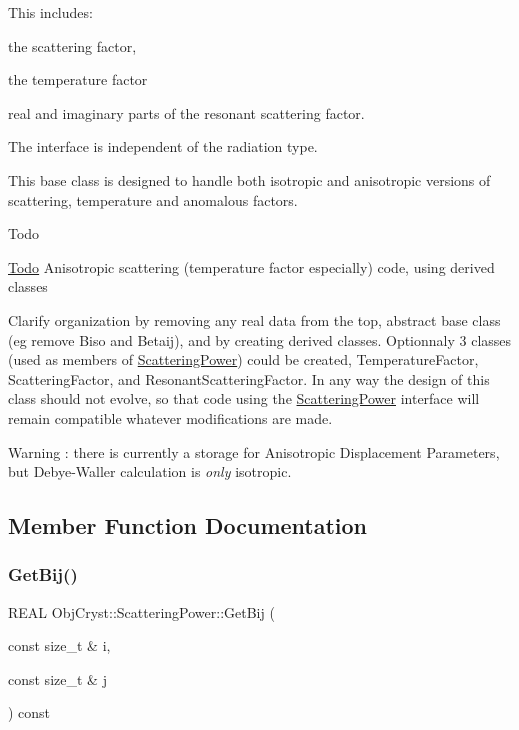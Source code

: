 This includes\+:
\begin{DoxyItemize}
\item the scattering factor,
\item the temperature factor
\item real and imaginary parts of the resonant scattering factor.
\end{DoxyItemize}

The interface is independent of the radiation type.

This base class is designed to handle both isotropic and anisotropic versions of scattering, temperature and anomalous factors.

\begin{DoxyRefDesc}{Todo}
\item[\mbox{\hyperlink{todo__todo000012}{Todo}}]Anisotropic scattering (temperature factor especially) code, using derived classes 

Clarify organization by removing any \textquotesingle{}real\textquotesingle{} data from the top, abstract base class (eg remove Biso and Betaij), and by creating derived classes. Optionnaly 3 classes (used as members of \mbox{\hyperlink{class_obj_cryst_1_1_scattering_power}{Scattering\+Power}}) could be created, Temperature\+Factor, Scattering\+Factor, and Resonant\+Scattering\+Factor. In any way the design of this class should not evolve, so that code using the \mbox{\hyperlink{class_obj_cryst_1_1_scattering_power}{Scattering\+Power}} interface will remain compatible whatever modifications are made. \end{DoxyRefDesc}
\begin{DoxyWarning}{Warning}
\+: there is currently a storage for Anisotropic Displacement Parameters, but Debye-\/\+Waller calculation is {\itshape only} isotropic. 
\end{DoxyWarning}


\subsection{Member Function Documentation}
\mbox{\label{class_obj_cryst_1_1_scattering_power_a659eaed09da7c108c2f1182b8d1ce0e8}} 
\subsubsection{\texorpdfstring{GetBij()}{GetBij()}\hspace{0.1cm}{\footnotesize\ttfamily [1/2]}}
{\footnotesize\ttfamily R\+E\+AL Obj\+Cryst\+::\+Scattering\+Power\+::\+Get\+Bij (\begin{DoxyParamCaption}\item[{const size\+\_\+t \&}]{i,  }\item[{const size\+\_\+t \&}]{j }\end{DoxyParamCaption}) const}



